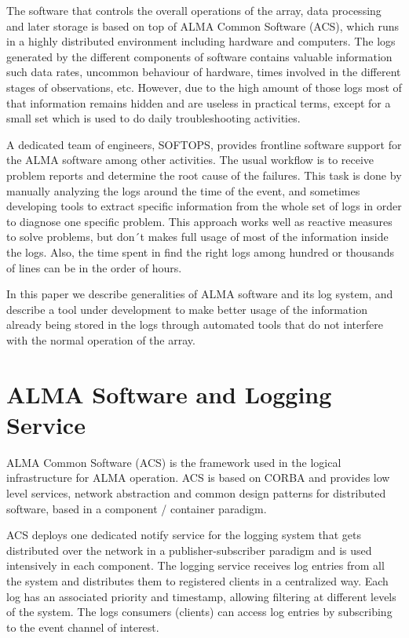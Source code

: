 \documentclass[]{spie}  %
\begin{document}
The software that controls the overall operations of the array, data processing
and later storage is based on top of ALMA Common Software (ACS), which runs in
a highly distributed environment including hardware and computers. The logs
generated by the different components of software contains valuable information
such data rates, uncommon behaviour of hardware, times involved in the
different stages of observations, etc. However, due to the high amount of those
logs most of that information remains hidden and are useless in practical terms,
except for a small set which is used to do daily troubleshooting activities.

A dedicated team of engineers, SOFTOPS, provides frontline
software support for the ALMA software among other activities\cite{gonzalez2010first}.
The usual workflow is to receive problem reports and determine the root cause of
the failures. This task is done by manually analyzing the logs around the time of
the event, and sometimes developing tools to extract specific information from
the whole set of logs in order to diagnose one specific problem. This approach
works well as reactive measures to solve problems, but don´t makes full usage
of most of the information inside the logs. Also, the time spent in find the
right logs among hundred or thousands of lines can be in the order of hours.

In this paper we describe generalities of ALMA software and its log system, and
describe a tool under development to make better usage of the information
already being stored in the logs through automated tools that do not interfere
with the normal operation of the array.

\section{ALMA Software and Logging Service}
ALMA Common Software (ACS) is the framework used in the logical infrastructure
for ALMA operation. ACS is based on CORBA and provides low level services,
    network abstraction and common design patterns for distributed software,
    based in a component / container paradigm\cite{schwarz2004alma}.

ACS deploys one dedicated notify service for the logging system that gets
distributed over the network in a publisher-subscriber paradigm and is used
intensively in each component. The logging service receives log entries from
all the system and distributes them to registered clients in a centralized
way. Each log has an associated priority and timestamp, allowing filtering at
different levels of the system. The logs consumers (clients) can access log
entries by subscribing to the event channel of interest.
\end{document}

